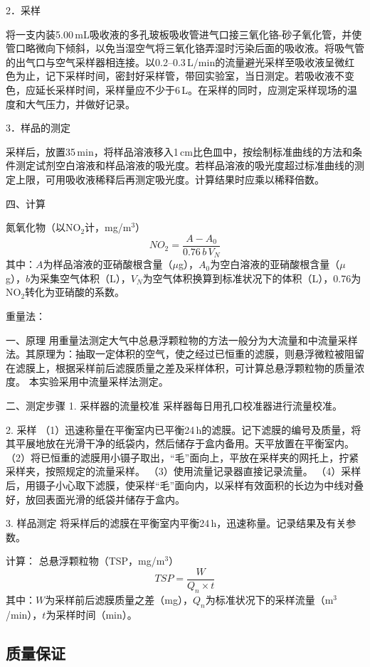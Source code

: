 \documentclass[12pt,hyperref,a4paper,UTF8]{ctexart}
\begin{document}
2．采样

将一支内装5.00\,mL吸收液的多孔玻板吸收管进气口接三氧化铬-砂子氧化管，并使管口略微向下倾斜，以免当湿空气将三氧化铬弄湿时污染后面的吸收液。将吸气管的出气口与空气采样器相连接。以0.2--0.3\,L/min的流量避光采样至吸收液呈微红色为止，记下采样时间，密封好采样管，带回实验室，当日测定。若吸收液不变色，应延长采样时间，采样量应不少于6\,L。在采样的同时，应测定采样现场的温度和大气压力，并做好记录。

3．样品的测定

采样后，放置35\,min，将样品溶液移入1\,cm比色皿中，按绘制标准曲线的方法和条件测定试剂空白溶液和样品溶液的吸光度。若样品溶液的吸光度超过标准曲线的测定上限，可用吸收液稀释后再测定吸光度。计算结果时应乘以稀释倍数。

四、计算

氮氧化物（以NO$_2$计，mg/m$^3$）
\[
NO_2 = \dfrac{A-A_0}{0.76\,b\,V_N}
\]
其中：$A$为样品溶液的亚硝酸根含量（$\mu$g），$A_0$为空白溶液的亚硝酸根含量（$\mu$g），$b$为采集空气体积（L），$V_N$为空气体积换算到标准状况下的体积（L），0.76为NO$_2$转化为亚硝酸的系数。




重量法：

一、原理 
用重量法测定大气中总悬浮颗粒物的方法一般分为大流量和中流量采样法。其原理为：抽取一定体积的空气，使之经过已恒重的滤膜，则悬浮微粒被阻留在滤膜上，根据采样前后滤膜质量之差及采样体积，可计算总悬浮颗粒物的质量浓度。
本实验采用中流量采样法测定。

二、测定步骤
1. 采样器的流量校准  
采样器每日用孔口校准器进行流量校准。

2. 采样  
（1）迅速称量在平衡室内已平衡24\,h的滤膜。记下滤膜的编号及质量，将其平展地放在光滑干净的纸袋内，然后储存于盒内备用。天平放置在平衡室内。  
（2）将已恒重的滤膜用小镊子取出，“毛”面向上，平放在采样夹的网托上，拧紧采样夹，按照规定的流量采样。  
（3）使用流量记录器直接记录流量。  
（4）采样后，用镊子小心取下滤膜，使采样“毛”面向内，以采样有效面积的长边为中线对叠好，放回表面光滑的纸袋并储存于盒内。

3. 样品测定  
将采样后的滤膜在平衡室内平衡24\,h，迅速称量。记录结果及有关参数。

计算：  
总悬浮颗粒物（TSP，mg/m$^3$）
\[
TSP= \dfrac{W}{Q_n \times t}
\]
其中：$W$为采样前后滤膜质量之差（mg），$Q_n$为标准状况下的采样流量（m$^3$/min），$t$为采样时间（min）。




\subsection{质量保证}  
\end{document}

